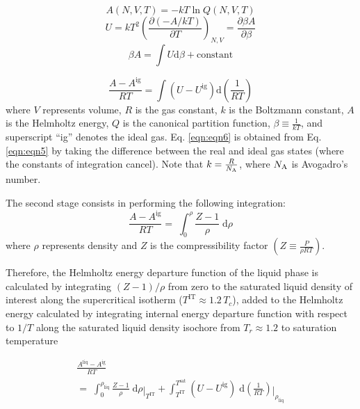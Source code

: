 \documentclass[5p,times]{elsarticle}
\begin{document}
\begin{equation}
A \left( N,V,T \right)=-kT \ln Q\left(N,V,T\right)
\label{eqn:eqn3}
\end{equation}
\begin{equation}
U=kT^{2} \left( \frac{\partial (-A/kT)}{\partial T} \right)_{N,V} =\frac{\partial \beta A}{\partial \beta }  \label{eqn:eqn4}
\end{equation}
\begin{equation}
\beta A=\int U\mathrm{d} \beta + \mathrm{constant}  \label{eqn:eqn5}
\end{equation}

\begin{equation}
 \frac{A-A^{\mathrm{ig}} }{RT} =\int \left( U-U^{\mathrm{ig}} \right) \mathrm{d}\left( \frac{1}{RT} \right) \label{eqn:eqn6}
\end{equation}
where $V$ represents volume, $R$ is the gas constant, $k$ is the Boltzmann constant, $A$ is the Helmholtz energy, $Q$ is the canonical partition function, $\beta \equiv \frac{1}{kT}$, and superscript ``ig'' denotes the ideal gas. 
Eq. \ref{eqn:eqn6} is obtained from Eq. \ref{eqn:eqn5} by taking the difference between the real and ideal gas states (where the constants of integration cancel). Note that $k =\frac{R}{N_{\rm A}}$, where $N_{\rm A}$ is Avogadro's number.

The second stage consists in performing the following integration: 
\begin{equation}
\frac{A-A^{\mathrm{ig}}}{RT} =\; \int _{0}^{\rho }\frac{Z-1}{\rho } \; \mathrm{d}\rho \label{eqn:eqn7}
\end{equation}
where $\rho$ represents density and $Z$ is the compressibility factor $(Z \equiv \frac{P}{\rho RT})$.

Therefore, the Helmholtz energy departure function of the liquid phase is calculated by integrating $(Z-1)/\rho$ from zero to the saturated liquid
density of interest along the supercritical isotherm ($T^{\mathrm{IT}} \approx 1.2\,T_c$), added to the Helmholtz energy calculated by integrating internal energy departure function with
respect to $1/T$ along the saturated liquid density isochore from $T_{r} \approx 1.2$ to saturation temperature

\begin{equation}
\begin{array}{l}
{\frac{A^{\mathrm{liq}} -A^{\mathrm{ig}} }{RT}} 
\\ 
{=\; \int _{0}^{\rho _{\mathrm{liq}} }\frac{Z-1}{\rho } \; \mathrm{d}\rho \mathop{|}\nolimits_{T^{\mathrm{IT}}} +\int _{T^{\mathrm{IT}}}^{T^{\mathrm{\mathrm{sat}}}
}(U-U^{\mathrm{ig}} )\; \mathrm{d} \left(\frac{1}{RT} \right) \mathop{|}\nolimits_{\rho _{\mathrm{liq}}}}  
\end{array} 
\label{eqn:eqn8}
\end{equation}
\end{document}
